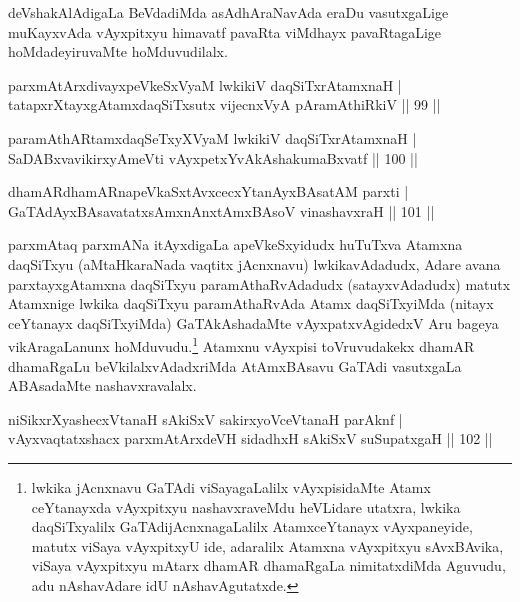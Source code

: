 \begin{artha}
deVshakAlAdigaLa BeVdadiMda asAdhAraNavAda eraDu vasutxgaLige muKayxvAda vAyxpitxyu himavatf pavaRta viMdhayx pavaRtagaLige hoMdadeyiruvaMte hoMduvudilalx.
\end{artha}

\begin{shl}
parxmAtArxdivayxpeVkeSxVyaM lwkikiV daqSiTxrAtamxnaH |\\
tatapxrXtayxgAtamxdaqSiTxsutx vijecnxVyA pAramAthiRkiV \hfill || 99 ||
\end{shl}

\begin{shl}
paramAthARtamxdaqSeTxyXVyaM lwkikiV daqSiTxrAtamxnaH |\\
SaDABxvavikirxyAmeVti vAyxpetxYvA\s \s kAshakumaBxvatf \hfill || 100 ||
\end{shl}

\begin{shl}
dhamARdhamARnapeVkaSxtAvxcecxYtanAyxBAsatAM parxti |\\
GaTAdAyxBAsavatatxsAmxnAnx\s \s tAmxBAsoV vinashavxraH \hfill || 101 ||
\end{shl}

\begin{artha}%
parxmAtaq parxmANa itAyxdigaLa apeVkeSxyidudx huTuTxva Atamxna daqSiTxyu (aMtaHkaraNada vaqtitx jAcnxnavu) lwkikavAdadudx, Adare avana parxtayxgAtamxna daqSiTxyu paramAthaRvAdadudx (satayxvAdadudx) matutx Atamxnige lwkika daqSiTxyu paramAthaRvAda Atamx daqSiTxyiMda (nitayx ceYtanayx daqSiTxyiMda) GaTAkAshadaMte vAyxpatxvAgidedxV Aru bageya vikAragaLanunx hoMduvudu.\footnote{lwkika jAcnxnavu GaTAdi viSayagaLalilx vAyxpisidaMte Atamx ceYtanayxda vAyxpitxyu nashavxraveMdu heVLidare utatxra, lwkika daqSiTxyalilx GaTAdijAcnxnagaLalilx AtamxceYtanayx vAyxpaneyide, matutx viSaya vAyxpitxyU ide, adaralilx Atamxna vAyxpitxyu sAvxBAvika, viSaya vAyxpitxyu mAtarx dhamAR dhamaRgaLa nimitatxdiMda Aguvudu, adu nAshavAdare idU nAshavAgutatxde.} Atamxnu vAyxpisi toVruvudakekx dhamAR dhamaRgaLu beVkilalxvAdadxriMda AtAmxBAsavu GaTAdi vasutxgaLa ABAsadaMte nashavxravalalx.
\end{artha}


\begin{shl}
niSikxrXyashecxVtanaH sAkiSxV sakirxyoV\s ceVtanaH parAknf |\\
vAyxvaqtatxshacx parxmAtArxdeVH sidadhxH sAkiSxV suSupatxgaH \hfill || 102 ||
\end{shl}

